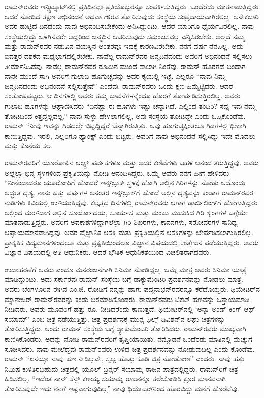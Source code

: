 ರಾಮನ್‌ರವರು ಇನ್ಸ್ಟಿಟ್ಯೂಟ್‌ನಲ್ಲಿ ಪ್ರತಿದಿನವೂ ಪ್ರತಿಯೊಬ್ಬರನ್ನೂ ಸಂಪರ್ಕಿಸುತ್ತಿದ್ದರು. ಒಂದೆರೆಡು ಮಾತನಾಡುತ್ತಿದ್ದರು. ಆದರೆ ನೋಡಿದ ತಕ್ಷಣ ಅಭಿನಂದನೆ ಅಥವಾ ಗೌರವ ತೋರಿಸುವುದು ಸಂಸ್ಥೆಯ ಸಂಪ್ರದಾಯವಾಗಿರಲಿಲ್ಲ. ಅನೇಕಬಾರಿ ಅವರ ಹುಟ್ಟಿದ ದಿನದಂದು ನಾವು ಅಭಿನಂದಿಸಬೇಕೆಂದು ಅನಿಸಿದ್ದುಂಟು. ಆದರೆ ಯಾರಿಗೂ ಧೈರ್ಯವಿರಲಿಲ್ಲ. ನಾವು ಸಂಸ್ಥೆಯಲ್ಲಿದ್ದು ಒಳಗಿನವರೇ ಆದ್ದರಿಂದ ಜನ್ಮದಿನ ಆಚರಿಸುವುದು ಸಮಂಜಸವಲ್ಲ ಎನ್ನಿಸಿರಬೇಕು. ಅಲ್ಲದೆ ನಮ್ಮ ಮತ್ತು ರಾಮನ್‌ರವರ ನಡುವಿನ ವಯಸ್ಸಿನ ಅಂತರವೂ ಇದಕ್ಕೆ ಕಾರಣವಿರಬೇಕು. ನನಗೆ ವರ್ಷ ನೆನಪಿಲ್ಲ. ಅದು ಐವತ್ತರ ದಶಕದ ಮಧ್ಯಭಾಗದಲ್ಲಿರಬೇಕು. ನಾವೆಲ್ಲ ರಾಮನ್‌ರವರ ಜನ್ಮದಿನದಂದು ಅವರಿಗೆ ಅಭಿನಂದನೆ ಸಲ್ಲಿಸಲು ತೀರ್ಮಾನಿಸಿದೆವು. ನಾವೆಲ್ಲ ರಾಮನ್‌ರವರ ರೂಮಿನ ಮುಂದೆ ಸಾಲಾಗಿ ನಿಂತೆವು. ರಾಮನ್ ಹೊರಗಡೆ ಬಂದಾಗ ನಾನೇ ಮುಂದೆ ಸಾಗಿ ಅವರಿಗೆ ಗುಲಾಬಿ ಹೂಗುಚ್ಛವನ್ನು ಅವರ ಕೈಯಲ್ಲಿ ಇಟ್ಟೆ. ಎಲ್ಲರೂ “ನಾವು ನಿಮ್ಮ ಜನ್ಮದಿನದಂದು ಅಭಿನಂದನೆ ಸಲ್ಲಿಸುತ್ತೇವೆ” ಎಂದೆವು. ರಾಮನ್‌ರವರು ಒಂದು ಕ್ಷಣ ಹಿಮ್ಮೆಟ್ಟಿದರು. ಆದರೆ ಸಂತೋಷಪಟ್ಟರು. ಆ ದಿನಗಳಲ್ಲಿ ಅವರು ತಮ್ಮ ಭಾವನೆಗಳನ್ನೆಂದೂ ಹೊರಗೆ ತೋರ್ಪಡಿಸುತ್ತಿರಲಿಲ್ಲ. ಅವರು ಗುಲಾಬಿ ಹೂಗಳನ್ನು ಆಘ್ರಾಣಿಸಿದರು “ಏನಪ್ಪಾ ಈ ಹೂಗಳು ಇಷ್ಟು ಚೆನ್ನಾಗಿದೆ. ಎಲ್ಲಿಂದ ತಂದಿರಿ? ಸದ್ಯ ಇವು ನಮ್ಮ ತೋಟದಿಂದ ಕಿತ್ತದ್ದಲ್ಲವಲ್ಲ.” ನಾವು ಸುಳ್ಳು ಹೇಳಲಾಗಲಿಲ್ಲ, ಅವು ಸಂಸ್ಥೆಯ ತೋಟದ್ದೇ ಎಂದು ಒಪ್ಪಿಕೊಂಡೆವು. ರಾಮನ್ “ನೀವು ಇವನ್ನು ಗಿಡದಲ್ಲೇ ಬಿಟ್ಟಿದ್ದಿದ್ದರೆ ಚೆನ್ನಾಗಿರುತ್ತಿತ್ತು. ಅವು ಹೂಗುಚ್ಛಕ್ಕಿಂತಲೂ ಗಿಡಗಳಲ್ಲಿ ಢೀಕಾಗಿ ಕಾಣುತ್ತಿದ್ದವು. ಇರಲಿ, ಎಲ್ಲರಿಗೂ ಥ್ಯಾಂಕ್ಸ್ ಎಂದು ಬಿಟ್ಟರು. ಅವರಿಗೆ ನಾವು ಅಭಿನಂದನೆ ಸಲ್ಲಿಸಿದ್ದು ಇದೇ ಮೊದಲು ಮತ್ತು ಕೊನೆಯ ಸಲ.

ರಾಮನ್‍ರವರಿಗೆ ಯೂರೋಪಿನ ಆಲ್ಪ್ಸ್ ಪರ್ವತಗಳೂ ಮತ್ತು ಅದರ ಕಣಿವೆಗಳು ಬಹಳ ಆನಂದ ತರುತ್ತಿದ್ದವು. ಅವರು ಅಲ್ಲೆಲ್ಲಾ ಭಿನ್ನ ಸ್ಥಳಗಳಿಂದ ಪ್ರಕೃತಿಯನ್ನು ನೋಡಿ ಆನಂದಿಸಿದ್ದರು. ಒಮ್ಮೆ ಅವರು ನನಗೆ ಹೀಗೆ ಹೇಳಿದರು\enginline{-} “ನೀನೆಂದಾದರೂ ಯೂರೋಪಿಗೆ ಹೋದರೆ ಇನ್ಸ್‌ಬ್ರುಕ್ ಸ್ಥಳಕ್ಕೆ ಹೋಗಿ ಅಲ್ಲಿನ ಗಿರಿಗಳನ್ನು ನೋಡು ಅದೊಂದು ಅದ್ಭುತ ದೃಶ್ಯ. ನಾನು ಹತ್ತು ವರ್ಷಗಳ ಅನಂತರ ಇನ್ಸ್‌ಬ್ರುಕ್‌ಗೆ ಹೋದೆ ಅಲ್ಲಿನ ದೃಶ್ಯವನ್ನು ಕಂಡಾಗ ರಾಮನ್‌ರವರ ನುಡಿಗಳು ಕಿವಿಯಲ್ಲಿ ಉಳಿಯುತ್ತಿದ್ದವು. ಕಲ್ಕತ್ತದ ದಿನಗಳಲ್ಲಿ ರಾಮನ್‌ರವರು ಆಗಾಗ ಡಾರ್ಜಿಲಿಂಗ್‌ಗೆ ಹೋಗುತ್ತಿದ್ದರು. ಅಲ್ಲಿಂದ ಮರಳಿದಾಗ ಅಲ್ಲಿನ ಸೂರ್ಯೋದಯ, ಸೂರ್ಯಸ್ತ ಮತ್ತು ಮಂಜು ಮುಸುಕಿದ ಗಿರಿ ಶೃಂಗಗಳ ಬಗ್ಗೆಯೇ ಮಾತನಾಡುತ್ತಿದ್ದರು. ಅವರಿಗೆ ಅವಕಾಶಗಳಿದ್ದಾಗಲೆಲ್ಲಾ ಗಿರಿ ಶಿಖರಗಳು, ಕಾನನಗಳು, ಸರೋವರಗಳ ಸಾನಿಧ್ಯ ಆಪ್ಯಾಯಮಾನವಾಗಿದ್ದವು. ಅವರ ವೈಜ್ಞಾನಿಕ ಆಸಕ್ತಿ ಮತ್ತು ಪ್ರಕೃತಿಯಲ್ಲಿನ ಆಸಕ್ತಿಗಳನ್ನು ಬೇರ್ಪಡಿಸಲಾಗುತ್ತಿರಲಿಲ್ಲ. ಪ್ರಾಕೃತಿಕ ವಿದ್ಯಮಾನಗಳಿಂದಲೂ ಮತ್ತು ಪ್ರಕೃತಿಯಿಂದಲೂ ವಿಜ್ಞಾನ ವಿಷಯದಲ್ಲಿ ಉತ್ತೇಜನ ಪಡೆಯುತ್ತಿದ್ದರು. ಅವರು ವಿಜ್ಞಾನ ವಿಷಯದಲ್ಲಿ ಅತಿ ಆಧುನಿಕರು. ಆದರೆ ಭೌತಿಕ ಆಧುನಿಕತೆಯಿಂದ ವಿಚಲಿತರಾಗದವರು.

ಉದಾಹರಣೆಗೆ ಅವರು ಎಂದೂ ಮನರಂಜನೆಗಾಗಿ ಸಿನಿಮಾ ನೋಡಿದ್ದಲ್ಲ. ಒಮ್ಮೆ ಮಾತ್ರ ಅವರು ಸಿನಿಮಾ ಯಾತ್ರೆ ಮಾಡಿದ್ದುಂಟು. ಅದು ಸರ್ಕಾರವು ರಾಮನ್ ಸಂಸ್ಥೆಯ ಬಗ್ಗೆ ಡಾಕ್ಯುಮೆಂಟರಿ ಪ್ರದರ್ಶನವನ್ನು ನೋಡಲು ಮಾತ್ರ. ಅವರು ಬೆಂಗಳೂರಿನ ಈಗಿನ ಎಂ.ಜಿ. ರೋಡಿಗೆ ನನ್ನನ್ನು ಹಾಗು ಪದ್ಮನಾಭನ್‌ರವರನ್ನೂ ಕರೆದೊಯ್ದರು. ಥಿಯೇಟರ್‌ನ ಮ್ಯಾನೇಜರ್ ರಾಮನ್‌ರವರನ್ನು ಕಂಡು ಬರಮಾಡಿಕೊಂಡರು. ರಾಮನ್‌ರವರು ಟಿಕೆಟ್ ಹಣವನ್ನು ಒತ್ತಾಯಮಾಡಿ ನೀಡಿದರು. ಅವರು ಮೂವರಿಗೆ ಹತ್ತು ರೂ. ನೀಡಿದರೆಂದು ಕಾಣುತ್ತದೆ. ಥಿಯೇಟರ್‌ನಲ್ಲಿ ‘ಅನ್ನಾ ಅಂಡ್ ಕಿಂಗ್ ಆಫ್ ಸಯಾಮ್’ ಎಂಬ ಚಿತ್ರ ನಡೆಯುತ್ತಿತ್ತು. ಚಿತ್ರ ಪ್ರದರ್ಶನಕ್ಕೆ ಮುನ್ನ ಫಿಲ್ಮ್ ಡಿವಿಶನ್‌ನ ಲಘು ಚಿತ್ರಗಳನ್ನು ತೋರಿಸುತ್ತಿದ್ದರು. ಅಂದು ರಾಮನ್ ಸಂಸ್ಥೆಯ ಬಗ್ಗೆ ಡ್ಯಾಕುಮೆಂಟರಿ ತೋರಿಸಿದರು. ರಾಮನ್‌ರವರು ಮುಖ್ಯವಾಗಿ ಕಾಣಿಸಿಕೊಂಡರು. ಅದನ್ನು ನೋಡಿ ರಾಮನ್‍ರವರಿಗೆ ತೃಪ್ತಿಯಾಯಿತು. ನಮ್ಮೊಡನೆ ಒಂದೆರಡು ಮಾತಿನಲ್ಲಿ ಮೆಚ್ಚುಗೆ ಸೂಚಿಸಿದರು. ನಾವು ಮೇಲೆದ್ದವು ರಾಮನ್‌ರವರು ಉಳಿದ ಚಿತ್ರ ಪ್ರದರ್ಶನವನ್ನು ನೋಡುವುದಿಲ್ಲ ಎಂದು ಕೊಂಡೆವು. ರಾಮನ್ “ಏನಯ್ಯಾ ನಾವು ಹಣ ನೀಡಿಲ್ಲವೇ, ಸ್ವಲ್ಪ ಹೊತ್ತು ಕೂಡಿ ಚಿತ್ರ ನೋಡೋಣ” ಎಂದರು. ನಾವು ಹತ್ತು ನಿಮಿಷ ಕುಳಿತಿರಬಹುದು ಚಿತ್ರದಲ್ಲಿ ಯೂಲ್ ಬ್ರನ್ನರ್ ಸಯಾಮ್ನ ರಾಜನ ಪಾತ್ರದಲ್ಲಿದ್ದರು. ರಾಮನ್‌ರಿಗೆ ಚಿತ್ರ ಹಿಡಿಸಲಿಲ್ಲ. “ಇದೆಂತ ನಾನ್ ಸೆನ್ಸ್ ಕಣಯ್ಯ ಸಯಾಮ್ನ ರಾಜನನ್ನೂ ತಲೆಬೋಡಿಸಿ ಕ್ರೂರ ಮಾನವನಾಗಿ ತೋರಿಸುವುದೇ ಇದು ನನಗೆ ಇಷ್ಟವಾಗುವುದಿಲ್ಲ” ನಾವು ಥಿಯೇಟರ್‌ನಿಂದ ಹೊರಬಿದ್ದು ಮನೆಗೆ ಹೊರೆಟೆವು.

